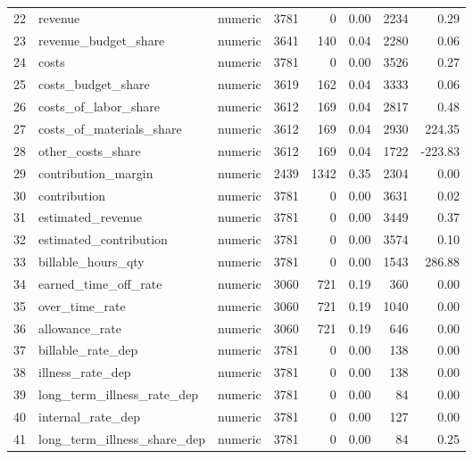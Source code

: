 \begin{sidewaystable}[ht]
\begin{tabular}{rllrrrrr}
  22 & revenue & numeric & 3781 &   0 & 0.00 & 2234 & 0.29 \\ 
  23 & revenue\_budget\_share & numeric & 3641 & 140 & 0.04 & 2280 & 0.06 \\ 
  24 & costs & numeric & 3781 &   0 & 0.00 & 3526 & 0.27 \\ 
  25 & costs\_budget\_share & numeric & 3619 & 162 & 0.04 & 3333 & 0.06 \\ 
  26 & costs\_of\_labor\_share & numeric & 3612 & 169 & 0.04 & 2817 & 0.48 \\ 
  27 & costs\_of\_materials\_share & numeric & 3612 & 169 & 0.04 & 2930 & 224.35 \\ 
  28 & other\_costs\_share & numeric & 3612 & 169 & 0.04 & 1722 & -223.83 \\ 
  29 & contribution\_margin & numeric & 2439 & 1342 & 0.35 & 2304 & 0.00 \\ 
  30 & contribution & numeric & 3781 &   0 & 0.00 & 3631 & 0.02 \\ 
  31 & estimated\_revenue & numeric & 3781 &   0 & 0.00 & 3449 & 0.37 \\ 
  32 & estimated\_contribution & numeric & 3781 &   0 & 0.00 & 3574 & 0.10 \\ 
  33 & billable\_hours\_qty & numeric & 3781 &   0 & 0.00 & 1543 & 286.88 \\ 
  34 & earned\_time\_off\_rate & numeric & 3060 & 721 & 0.19 & 360 & 0.00 \\ 
  35 & over\_time\_rate & numeric & 3060 & 721 & 0.19 & 1040 & 0.00 \\ 
  36 & allowance\_rate & numeric & 3060 & 721 & 0.19 & 646 & 0.00 \\ 
  37 & billable\_rate\_dep & numeric & 3781 &   0 & 0.00 & 138 & 0.00 \\ 
  38 & illness\_rate\_dep & numeric & 3781 &   0 & 0.00 & 138 & 0.00 \\ 
  39 & long\_term\_illness\_rate\_dep & numeric & 3781 &   0 & 0.00 &  84 & 0.00 \\ 
  40 & internal\_rate\_dep & numeric & 3781 &   0 & 0.00 & 127 & 0.00 \\ 
  41 & long\_term\_illness\_share\_dep & numeric & 3781 &   0 & 0.00 &  84 & 0.25 \\ 
   \hline
\end{tabular}
\end{sidewaystable}
